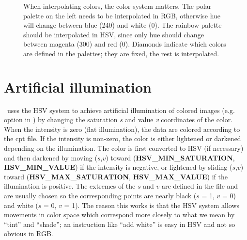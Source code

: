 \begin{figure}[h]
   \caption{When interpolating colors, the color system matters. The polar palette on the left needs to be interpolated in RGB, otherwise hue will change between blue (240\DS) and white (0\DS). The rainbow palette should be interpolated in HSV, since only hue should change between magenta (300\DS) and red (0\DS). Diamonds indicate which colors are defined in the palettes; they are fixed, the rest is interpolated.}
   \label{fig:GMT_color_interpolate}
\end{figure}

\section{Artificial illumination}
\GMT\ uses the HSV system to
achieve artificial illumination of colored images (e.g. 
option in ) by changing the saturation \emph{s} and value \emph{v}
coordinates of the color.  When the intensity is zero (flat illumination), the data
are colored according to the cpt file.  If the intensity is
non-zero, the color is either lightened or darkened depending on the illumination.
The color is first converted to HSV (if necessary) and then
darkened by moving ($s$,$v$) toward (\textbf{HSV\_MIN\_SATURATION},
\textbf{HSV\_MIN\_VALUE}) if the intensity is negative, or lightened by sliding ($s$,$v$) toward
(\textbf{HSV\_MAX\_SATURATION}, \textbf{HSV\_MAX\_VALUE}) if the illumination is positive.
The extremes of the $s$ and $v$ are defined in the  file and are usually
chosen so the corresponding points are nearly black ($s$ = 1,
$v$ = 0) and white ($s$ = 0, $v$ = 1).
The reason this works is that the HSV system allows movements in
color space which correspond more closely to what we mean by
``tint'' and ``shade''; an instruction like ``add white'' is
easy in HSV and not so obvious in RGB.

